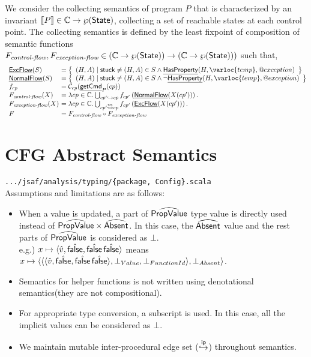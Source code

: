  We consider the collecting semantics of program $P$ that is characterized by an
 invariant $\llbracket P\rrbracket \in \mathbb{C} \rightarrow \wp(\mbox{\textsf{State}})$,
 collecting a set of reachable states at each control point.
 The collecting semantics is defined by the least fixpoint of composition of 
 semantic functions
 $F_{\textit{control-flow}},F_{\textit{exception-flow}}\in (\mathbb{C}\rightarrow \wp(\mbox{\textsf{State}}))\rightarrow (\mathbb{C}\rightarrow \wp(\mbox{\textsf{State}})))$
 such that,
\[
\begin{array}{l@{~}l@{}}
\chf{ExcFlow}(S) & = \set{(H,A)\mid \SF{stuck}\neq(H,A)\in S \land \chf{HasProperty}(H,\varloc{temp},\varprop{exception})} \\
\chf{NormalFlow}(S) & = \set{(H,A)\mid \SF{stuck}\neq(H,A)\in S \land \lnot \chf{HasProperty}(H,\varloc{temp},\varprop{exception})} \\
f_{cp} & = \N_{cp}(\chf{getCmd}_P(cp)) \\
F_{\textit{control-flow}}(X)&=\lambda cp\in\controlpoint. \bigcup_{cp'\cfgnext cp}f_{cp'}\left(\chf{NormalFlow}(X(cp'))\right). \\
F_{\textit{exception-flow}}(X)&=\lambda cp\in\controlpoint. \bigcup_{cp'\excnext cp}f_{cp'}\left(\chf{ExcFlow}(X(cp'))\right). \\
F & = F_{\textit{control-flow}} \circ F_{\textit{exception-flow}}
\end{array}
\]

\newpage
\chapter{CFG Abstract Semantics}
{\inblue\tt .../jsaf/analysis/typing/\{package, Config\}.scala}\\

Assumptions and limitations are as follows:
\begin{itemize}
  \item When a value is updated, a part of $\widehat{\mbox{\textsf{PropValue}}}$ type value is directly used instead of $\widehat{\mbox{\textsf{PropValue}}}\times\widehat{\mbox{\textsf{Absent}}}$. In this case, the $\widehat{\mbox{\textsf{Absent}}}$ value and the rest parts of $\widehat{\mbox{\textsf{PropValue}}}$ is considered as $\bot$.\\ e.g.) $x\mapsto \langle\hat{v},\hat{\mbox{\textsf{false}}},\hat{\mbox{\textsf{false}}}\,\hat{\mbox{\textsf{false}}}\rangle$ means $x\mapsto \langle\langle\langle\hat{v},\hat{\mbox{\textsf{false}}},\hat{\mbox{\textsf{false}}}\,\hat{\mbox{\textsf{false}}}\rangle,\bot_{Value},\bot_{FunctionId}\rangle,\bot_{Absent}\rangle$.

  \item Semantics for helper functions is not written using denotational semantics(they are not compositional).
  \item For appropriate type conversion, a subscript is used. In this case, all the implicit values can be
    considered as $\bot$.
  \item We maintain mutable inter-procedural edge set ($\stackrel{\mathsf{ip}}{\hookrightarrow}$) throughout semantics.
\end{itemize}


